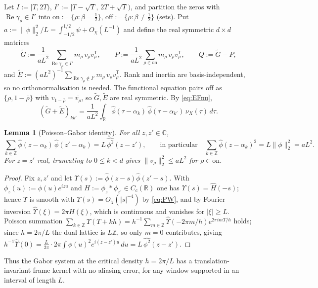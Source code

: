 \documentclass[11pt]{amsart}
\newtheorem{lemma}[theorem]{Lemma}
\theoremstyle{definition}
\theoremstyle{remark}
\numberwithin{equation}{section}
\DeclareMathOperator{\re}{Re}
\newcommand{\RR}{\mathbb{R}}
\newcommand{\CC}{\mathbb{C}}
\newcommand{\ZZ}{\mathbb{Z}}
\newcommand{\wh}{\widehat}
\newcommand{\ol}{\overline}
\newcommand{\Gt}{\widetilde{G}}
\newcommand{\Et}{\widetilde{E}}
\newcommand{\dd}{\,d}
\begin{document}
Let $I:=[T,2T)$, $I':=[T-\sqrt T,\,2T+\sqrt T)$, and partition the zeros with $\re\gamma_\rho\in I'$ into $\mathrm{on}:=\{\rho:\beta=\tfrac12\}$, $\mathrm{off}:=\{\rho:\beta\ne\tfrac12\}$ (sets). Put $a:=\|\phi\|_2^2/L=\int_{-1/2}^{1/2}\psi+O_\chi(L^{-1})$ and define the real symmetric $d\times d$ matrices
\begin{equation}\label{eq:Gdef}
\Gt:=\frac1{aL^2}\sum_{\re\gamma_\rho\in I'}m_\rho\,v_\rho v_\rho^{\mathsf T},
\qquad
P:=\frac1{aL^2}\sum_{\rho\in\mathrm{on}}m_\rho\,v_\rho v_\rho^{\mathsf T},
\qquad
Q:=\Gt-P,
\end{equation}
and $\Et:=(aL^2)^{-1}\sum_{\re\gamma_\rho\notin I'}m_\rho\,v_\rho v_\rho^{\mathsf T}$. Rank and inertia are basis-independent, so no orthonormalisation is needed. The functional equation pairs $\mathrm{off}$ as $\{\rho,1-\bar\rho\}$ with $v_{1-\bar\rho}=\ol{v_\rho}$, so $\Gt,\Et$ are real symmetric. By \eqref{eq:EFnu},
\begin{equation}\label{eq:Gprime}
(\Gt+\Et)_{kk'}=\frac1{aL^2}\int_\RR\wh\phi(\tau-\alpha_k)\,\wh\phi(\tau-\alpha_{k'})\,\nu_X(\tau)\dd\tau.
\end{equation}


\begin{lemma}[Poisson--Gabor identity]\label{lem:poisson}
For all $z,z'\in\CC$,
\[
\sum_{k\in\ZZ}\wh\phi(z-\alpha_k)\,\wh\phi(z'-\alpha_k)=L\,\wh{\phi^2}(z-z'),\qquad\text{in particular}\quad \sum_{k\in\ZZ}\wh\phi(z-\alpha_k)^2=L\|\phi\|_2^2=aL^2 .
\]
For $z=z'$ real, truncating to $0\le k<d$ gives $\|v_\rho\|_2^2\le aL^2$ for $\rho\in\mathrm{on}$.
\end{lemma}
\begin{proof}
Fix $z,z'$ and let $\Upsilon(s):=\wh\phi(z-s)\wh\phi(z'-s)$. With $\phi_z(u):=\phi(u)e^{izu}$ and $H:=\phi_z\ast\phi_{z'}\in C_c(\RR)$ one has $\Upsilon(s)=\wh H(-s)$; hence $\Upsilon$ is smooth with $\Upsilon(s)=O_\chi(|s|^{-4})$ by \eqref{eq:PW}, and by Fourier inversion $\wh \Upsilon(\xi)=2\pi H(\xi)$, which is continuous and vanishes for $|\xi|\ge L$. Poisson summation $\sum_{k\in\ZZ}\Upsilon(T+kh)=h^{-1}\sum_{m\in\ZZ}\wh \Upsilon(-2\pi m/h)e^{2\pi i mT/h}$ holds; since $h=2\pi/L$ the dual lattice is $L\ZZ$, so only $m=0$ contributes, giving $h^{-1}\wh \Upsilon(0)=\frac{L}{2\pi}\cdot2\pi\int\phi(u)^2e^{i(z-z')u}\dd u=L\,\wh{\phi^2}(z-z')$.
\end{proof}
Thus the Gabor system at the critical density $h=2\pi/L$ has a translation-invariant frame kernel with no aliasing error, for any window supported in an interval of length $L$.
\end{document}
